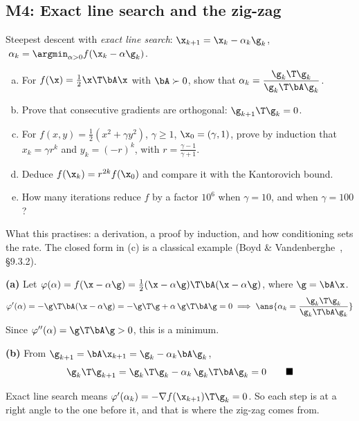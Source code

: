 \subsection{M4: Exact line search and the zig-zag}

\begin{frame}{}
  \begin{probbox}
    Steepest descent with \emph{exact line search}:
    $\x_{k+1} = \x_k - \alpha_k\g_k$, $\;\alpha_k = \argmin_{\alpha>0} f(\x_k - \alpha\g_k)$.
    \begin{enumerate}[(a)]
      \item For $f(\x) = \tfrac12\x\T\bA\x$ with $\bA \succ 0$, show that $\alpha_k = \dfrac{\g_k\T\g_k}{\g_k\T\bA\g_k}$.
      \item Prove that consecutive gradients are orthogonal: $\g_{k+1}\T\g_k = 0$.
      \item For $f(x,y) = \tfrac12(x^2 + \gamma y^2)$, $\gamma\ge1$, $\x_0 = (\gamma,1)$, prove by induction that
            $x_k = \gamma r^k$ and $y_k = (-r)^k$, with $r = \frac{\gamma-1}{\gamma+1}$.
      \item Deduce $f(\x_k) = r^{2k}f(\x_0)$ and compare it with the Kantorovich bound.
      \item How many iterations reduce $f$ by a factor $10^6$ when $\gamma = 10$, and when $\gamma = 100$?
    \end{enumerate}
  \end{probbox}
  \footnotesize\textcolor{mGrey}{What this practises: a derivation, a proof by induction, and how conditioning sets the rate.
  The closed form in (c) is a classical example (Boyd \& Vandenberghe~\cite{boyd2004}, \S 9.3.2).}
\end{frame}

\begin{frame}{}
  \textbf{(a)} Let $\varphi(\alpha) = f(\x - \alpha\g) = \tfrac12(\x-\alpha\g)\T\bA(\x-\alpha\g)$, where $\g = \bA\x$.
  \[
    \varphi'(\alpha) = -\g\T\bA(\x - \alpha\g) = -\g\T\g + \alpha\,\g\T\bA\g = 0
    \;\Longrightarrow\; \ans{\alpha_k = \frac{\g_k\T\g_k}{\g_k\T\bA\g_k}}
  \]
  Since $\varphi''(\alpha) = \g\T\bA\g > 0$, this is a minimum.

  \vspace{4pt}
  \textbf{(b)} From $\g_{k+1} = \bA\x_{k+1} = \g_k - \alpha_k\bA\g_k$,
  \[
    \g_k\T\g_{k+1} = \g_k\T\g_k - \alpha_k\,\g_k\T\bA\g_k = 0 \qquad\blacksquare
  \]
  \begin{keybox}
    Exact line search means $\varphi'(\alpha_k) = -\nabla f(\x_{k+1})\T\g_k = 0$.
    So each step is at a \alert{right angle} to the one before it, and that is where the zig-zag comes from.
  \end{keybox}
\end{frame}

